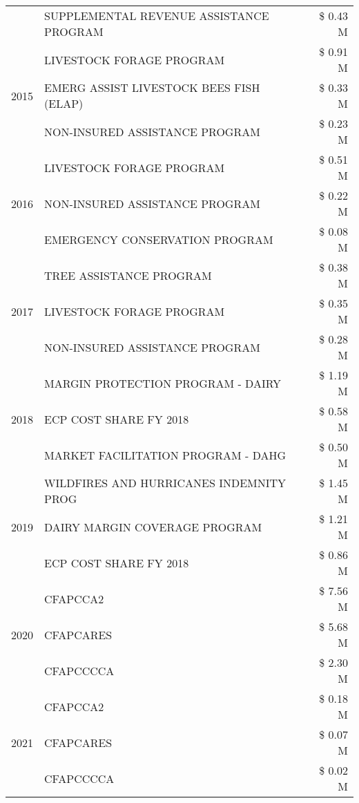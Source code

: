 \begin{tabular}{llr}
 & SUPPLEMENTAL REVENUE ASSISTANCE PROGRAM & \$ 0.43 M \\
\cline{1-3}
\multirow[t]{3}{*}{2015} & LIVESTOCK FORAGE PROGRAM & \$ 0.91 M \\
 & EMERG ASSIST LIVESTOCK BEES FISH (ELAP) & \$ 0.33 M \\
 & NON-INSURED ASSISTANCE PROGRAM & \$ 0.23 M \\
\cline{1-3}
\multirow[t]{3}{*}{2016} & LIVESTOCK FORAGE PROGRAM                      & \$ 0.51 M \\
 & NON-INSURED ASSISTANCE PROGRAM                & \$ 0.22 M \\
 & EMERGENCY CONSERVATION PROGRAM                & \$ 0.08 M \\
\cline{1-3}
\multirow[t]{3}{*}{2017} & TREE ASSISTANCE PROGRAM & \$ 0.38 M \\
 & LIVESTOCK FORAGE PROGRAM & \$ 0.35 M \\
 & NON-INSURED ASSISTANCE PROGRAM & \$ 0.28 M \\
\cline{1-3}
\multirow[t]{3}{*}{2018} & MARGIN PROTECTION PROGRAM - DAIRY & \$ 1.19 M \\
 & ECP COST SHARE FY 2018 & \$ 0.58 M \\
 & MARKET FACILITATION PROGRAM - DAHG & \$ 0.50 M \\
\cline{1-3}
\multirow[t]{3}{*}{2019} & WILDFIRES AND HURRICANES INDEMNITY PROG & \$ 1.45 M \\
 & DAIRY MARGIN COVERAGE PROGRAM & \$ 1.21 M \\
 & ECP COST SHARE FY 2018 & \$ 0.86 M \\
\cline{1-3}
\multirow[t]{3}{*}{2020} & CFAPCCA2 & \$ 7.56 M \\
 & CFAPCARES & \$ 5.68 M \\
 & CFAPCCCCA & \$ 2.30 M \\
\cline{1-3}
\multirow[t]{3}{*}{2021} & CFAPCCA2 & \$ 0.18 M \\
 & CFAPCARES & \$ 0.07 M \\
 & CFAPCCCCA & \$ 0.02 M \\
\cline{1-3}
\bottomrule
\end{tabular}
